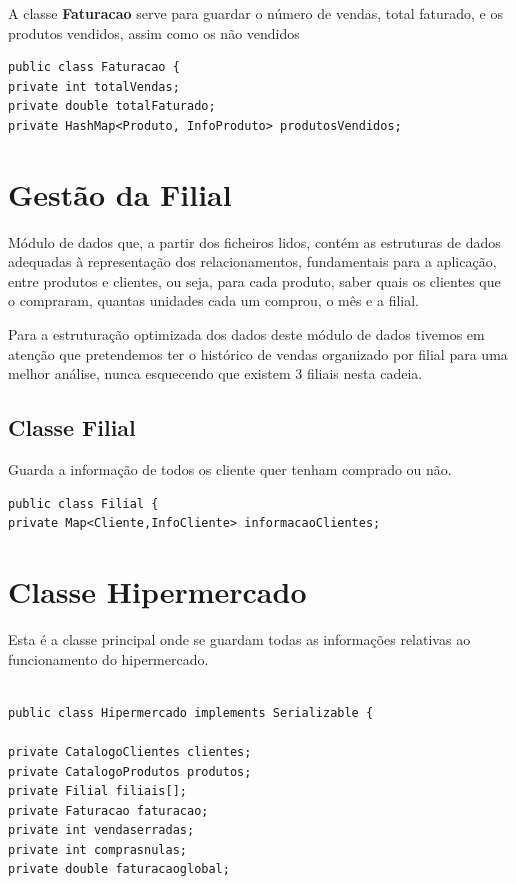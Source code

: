 A classe  \color{blue} \textbf{Faturacao} \color{black} serve para guardar o número de vendas, total faturado, e os produtos vendidos, assim como os não vendidos 

\begin{verbatim}
public class Faturacao {
private int totalVendas;
private double totalFaturado;
private HashMap<Produto, InfoProduto> produtosVendidos;
\end{verbatim}



\section{Gestão da Filial}

Módulo de dados que, a partir dos ficheiros lidos, contém as estruturas de dados adequadas à representação dos relacionamentos, fundamentais para a aplicação, entre produtos e clientes, ou seja, para cada produto, saber quais os clientes que o compraram, quantas unidades cada um comprou, o mês e a filial.

 Para a estruturação optimizada dos dados deste módulo de dados tivemos em atenção que pretendemos ter o histórico de vendas organizado por filial para uma melhor análise, nunca esquecendo que existem 3 filiais nesta cadeia. 

\subsection{Classe Filial}
Guarda a informação de todos os cliente quer tenham comprado ou não. 

\begin{verbatim}
public class Filial {
private Map<Cliente,InfoCliente> informacaoClientes; 
\end{verbatim}

\section{Classe Hipermercado }

Esta é a classe principal onde se guardam todas as informações relativas ao funcionamento do hipermercado. 

\begin{verbatim}

public class Hipermercado implements Serializable {

private CatalogoClientes clientes;
private CatalogoProdutos produtos;
private Filial filiais[];
private Faturacao faturacao;
private int vendaserradas;
private int comprasnulas;
private double faturacaoglobal;
\end{verbatim}

